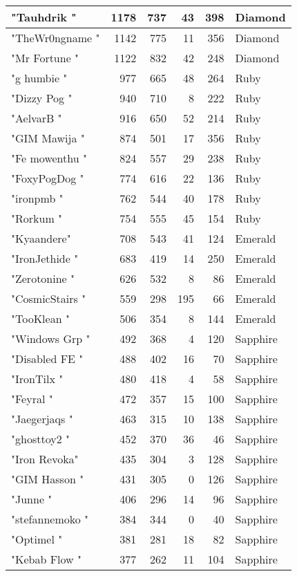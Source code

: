 \documentclass{article}
\begin{document}
\begin{table}[htbp]
\begin{tabular}{|l|r|r|r|r|l|}
"Tauhdrik " & 1178 & 737 & 43 & 398 & Diamond \\ \hline
"TheWr0ngname " & 1142 & 775 & 11 & 356 & Diamond \\ \hline
"Mr Fortune " & 1122 & 832 & 42 & 248 & Diamond \\ \hline
"g humbie " & 977 & 665 & 48 & 264 & Ruby \\ \hline
"Dizzy Pog " & 940 & 710 & 8 & 222 & Ruby \\ \hline
"AelvarB " & 916 & 650 & 52 & 214 & Ruby \\ \hline
"GIM Mawija " & 874 & 501 & 17 & 356 & Ruby \\ \hline
"Fe mowenthu " & 824 & 557 & 29 & 238 & Ruby \\ \hline
"FoxyPogDog " & 774 & 616 & 22 & 136 & Ruby \\ \hline
"ironpmb " & 762 & 544 & 40 & 178 & Ruby \\ \hline
"Rorkum " & 754 & 555 & 45 & 154 & Ruby \\ \hline
"Kyaandere" & 708 & 543 & 41 & 124 & Emerald \\ \hline
"IronJethide " & 683 & 419 & 14 & 250 & Emerald \\ \hline
"Zerotonine " & 626 & 532 & 8 & 86 & Emerald \\ \hline
"CosmicStairs " & 559 & 298 & 195 & 66 & Emerald \\ \hline
"TooKlean " & 506 & 354 & 8 & 144 & Emerald \\ \hline
"Windows Grp " & 492 & 368 & 4 & 120 & Sapphire \\ \hline
"Disabled FE " & 488 & 402 & 16 & 70 & Sapphire \\ \hline
"IronTilx " & 480 & 418 & 4 & 58 & Sapphire \\ \hline
"Feyral " & 472 & 357 & 15 & 100 & Sapphire \\ \hline
"Jaegerjaqs " & 463 & 315 & 10 & 138 & Sapphire \\ \hline
"ghosttoy2 " & 452 & 370 & 36 & 46 & Sapphire \\ \hline
"Iron Revoka" & 435 & 304 & 3 & 128 & Sapphire \\ \hline
"GIM Hasson " & 431 & 305 & 0 & 126 & Sapphire \\ \hline
"Junne " & 406 & 296 & 14 & 96 & Sapphire \\ \hline
"stefannemoko " & 384 & 344 & 0 & 40 & Sapphire \\ \hline
"Optimel " & 381 & 281 & 18 & 82 & Sapphire \\ \hline
"Kebab Flow " & 377 & 262 & 11 & 104 & Sapphire \\ \hline

\end{tabular}
\end{table}
\end{document}
